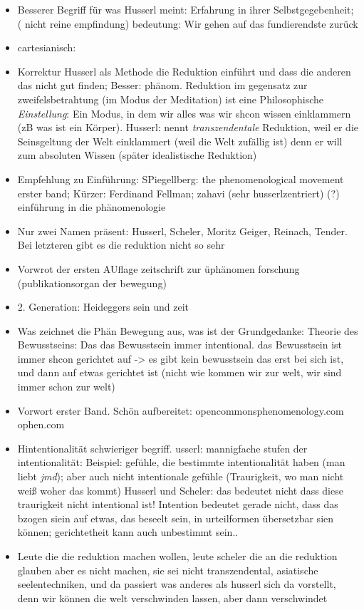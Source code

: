 \documentclass[emulatestandardclasses]{scrartcl}
\begin{document}
\begin{itemize}
  \item Besserer Begriff für was Husserl meint: Erfahrung in ihrer Selbstgegebenheit; ( nicht reine empfindung) bedeutung: Wir gehen auf das fundierendste zurück
  \item cartesianisch:
  \item Korrektur Husserl als Methode die Reduktion einführt und dass die anderen das nicht gut finden; Besser: phänom. Reduktion im gegensatz zur zweifelsbetrahtung (im Modus der Meditation) ist eine Philosophische \emph{Einstellung}: Ein Modus, in dem wir alles was wir shcon wissen einklammern (zB was ist ein Körper). Husserl: nennt \emph{transzendentale} Reduktion, weil er die Seinsgeltung der Welt einklammert (weil die Welt zufällig ist) denn er will zum absoluten Wissen (später idealistische Reduktion)
  \item Empfehlung zu Einführung: SPiegellberg: the phenomenological movement erster band; Kürzer: Ferdinand Fellman; zahavi (sehr husserlzentriert) (?) einführung in die phänomenologie
  \item Nur zwei Namen präsent: Husserl, Scheler, Moritz Geiger, Reinach, Tender. Bei letzteren gibt es die reduktion nicht so sehr
  \item Vorwrot der ersten AUflage zeitschrift zur üphänomen forschung (publikationsorgan der bewegung)
  \item 2. Generation: Heideggers sein und zeit
  \item Was zeichnet die Phän Bewegung aus, was ist der Grundgedanke: Theorie des Bewusstseins: Das das Bewusstsein immer intentional. das Bewusstsein ist immer shcon gerichtet auf -> es gibt kein bewusstsein das erst bei sich ist, und dann auf etwas gerichtet ist (nicht wie kommen wir zur welt, wir sind immer schon zur welt)
  \item Vorwort erster Band. Schön aufbereitet: opencommonsphenomenology.com ophen.com
  \item Hintentionalität schwieriger begriff. usserl: mannigfache stufen der intentionalität: Beispiel: gefühle, die bestimmte intentionalität haben (man liebt \emph{jmd}); aber auch nicht intentionale gefühle (Traurigkeit, wo man nicht weiß woher das kommt) Husserl und Scheler: das bedeutet nicht dass diese traurigkeit nicht intentional ist! Intention bedeutet gerade nicht, dass das bzogen siein auf etwas, das beseelt sein, in urteilformen übersetzbar sien können; gerichtetheit kann auch unbestimmt sein..
  \item Leute die die reduktion machen wollen, leute scheler die an die reduktion glauben aber es nicht machen, sie sei nicht transzendental, asiatische seelentechniken, und da passiert was anderes als husserl sich da vorstellt, denn wir können die welt verschwinden lassen, aber dann verschwindet 

\end{itemize}
\end{document}
